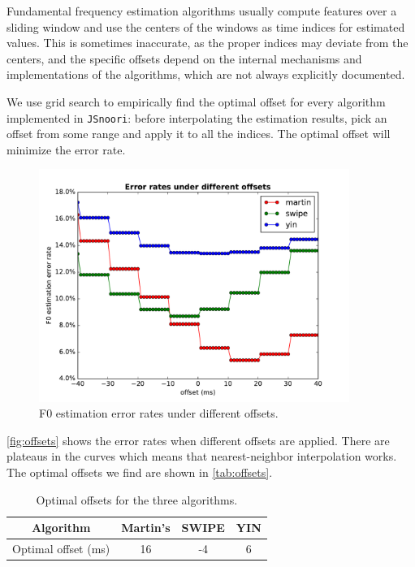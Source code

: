 \documentclass[11pt,a4paper]{report}
\begin{document}
Fundamental frequency estimation algorithms usually compute features over a sliding window and use the centers of the windows as time indices for estimated values.
This is sometimes inaccurate, as the proper indices may deviate from the centers, and the specific offsets depend on the internal mechanisms and implementations of the algorithms, which are not always explicitly documented.

We use grid search to empirically find the optimal offset for every algorithm implemented in \texttt{JSnoori}: before interpolating the estimation results, pick an offset from some range and apply it to all the indices.
The optimal offset will minimize the error rate.

\begin{figure}[htbp]
  \centering
  \includegraphics[width=0.9\textwidth]{error_rates_vs_offsets.pdf}
  \caption{F0 estimation error rates under different offsets.} \label{fig:offsets}
\end{figure}

\autoref{fig:offsets} shows the error rates when different offsets are applied.
There are plateaus in the curves which means that nearest-neighbor interpolation works.
The optimal offsets we find are shown in \autoref{tab:offsets}.

\begin{table}[htbp]
  \centering
  \begin{tabular}{cSSS}
  	\toprule
  	             Algorithm              & {Martin's} & {SWIPE} & {YIN} \\
  	\midrule
  	Optimal offset (\si{\milli\second}) & 16         & -4      & 6     \\
  	\bottomrule
  \end{tabular}
  \caption{Optimal offsets for the three algorithms.} \label{tab:offsets}
\end{table}
\end{document}
